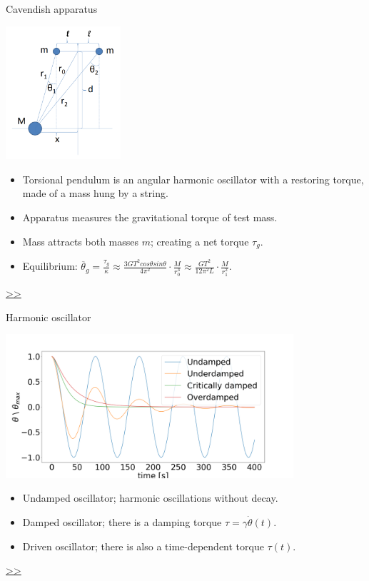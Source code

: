 \documentclass{beamer}
\begin{document}
\begin{frame}{\hypertarget{frame:Cavendish apparatus}{Cavendish apparatus}}
	\begin{center}		
\includegraphics[width=0.32\textwidth,keepaspectratio]{Cavendish apparatus.PNG}
    \end{center}
	\begin{itemize}
		\item Torsional pendulum is an angular harmonic oscillator with a restoring torque, made of a mass hung by a string. 
		\item Apparatus measures the gravitational torque of test mass.
		\item Mass attracts both masses $m$; creating a net torque $\tau_g$.
		\item Equilibrium: $\overline{\theta}_g = \frac{\tau_g}{\kappa} \approx \frac{3GT^2cos\theta sin\theta}{4\pi^2 } \cdot \frac{M}{r_0^3} \approx \frac{GT^2}{12\pi^2 L } \cdot \frac{M}{r_1^2} $.

	\end{itemize}
	\hyperlink{frame:Cavendish apparatus 1}{>>} 
\end{frame}

\begin{frame}{\hypertarget{frame:Harmonic oscillator}{Harmonic oscillator}}
	\begin{center}		
		\includegraphics[width=0.8\textwidth,keepaspectratio]{damp.png}
    \end{center}
	\begin{itemize}

		\item Undamped oscillator; harmonic oscillations without decay.
		\item Damped oscillator; there is a damping torque $\tau = \gamma\dot{\theta}(t)$.
		\item Driven oscillator; there is also a time-dependent torque $\tau(t)$.
		
	\end{itemize}
	\hyperlink{frame:Damped oscillator}{>>}
\end{frame}
\end{document}
